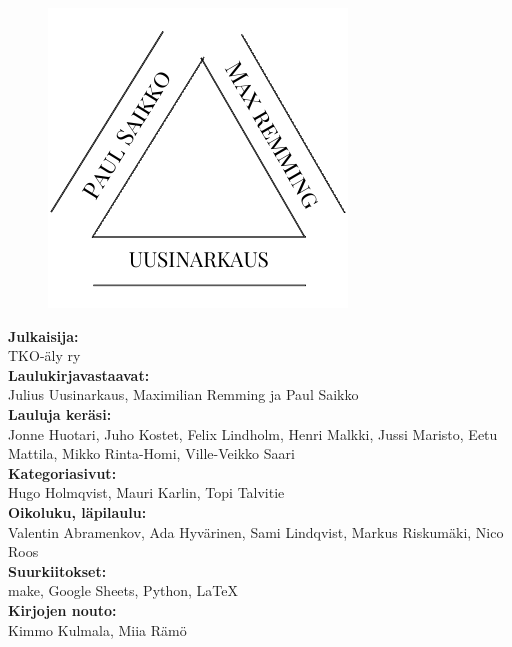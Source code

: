 


\newpage
\begin{figure}[t]
\vspace{-0.8cm}
\centering
\includegraphics[scale=0.70]{graphics/tekijat.pdf}
\vspace{-0.9cm}
\end{figure}

\noindent
\textbf{Julkaisija:} \\
\noindent
TKO-äly ry \\

\noindent
\textbf{Laulukirjavastaavat:} \\
\noindent
Julius Uusinarkaus, Maximilian Remming ja Paul Saikko \\

\noindent
\textbf{Lauluja keräsi:} \\
\noindent
Jonne Huotari, Juho Kostet, Felix Lindholm, Henri Malkki, Jussi Maristo, Eetu Mattila, Mikko Rinta-Homi, Ville-Veikko Saari\\

\noindent
\textbf{Kategoriasivut:} \\
\noindent
Hugo Holmqvist, Mauri Karlin, Topi Talvitie \\

\noindent
\textbf{Oikoluku, läpilaulu:} \\
\noindent
Valentin Abramenkov, Ada Hyvärinen, Sami Lindqvist, Markus Riskumäki, Nico Roos\\

\noindent
\textbf{Suurkiitokset:} \\
\noindent
make, Google Sheets, Python, \LaTeX \\

\noindent
\textbf{Kirjojen nouto:} \\
\noindent
Kimmo Kulmala, Miia Rämö \\

